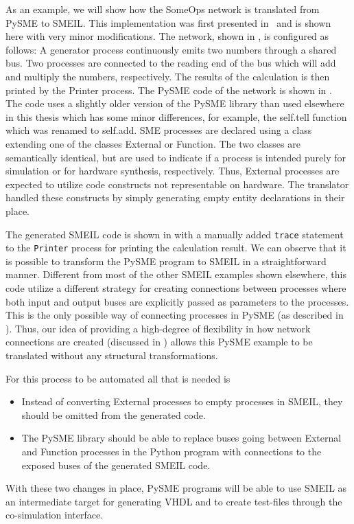 As an example, we will show how the SomeOps network is translated from PySME to
SMEIL.  This implementation was first presented in~\cite{asheim2016vhdl} and is
shown here with very minor modifications. The network, shown in
, is configured as follows: A generator process continuously
emits two numbers through a shared bus.  Two processes are connected to the
reading end of the bus which will add and multiply the numbers,
respectively. The results of the calculation is then printed by the Printer
process.  The PySME code of the network is shown in . The
code uses a slightly older version of the PySME library than used elsewhere in
this thesis which has some minor differences, for example, the {\ttfamily
  self.tell} function which was renamed to {\ttfamily self.add}.  SME processes
are declared using a class extending one of the classes {\ttfamily External} or
{\ttfamily Function}.  The two classes are semantically identical, but are used
to indicate if a process is intended purely for simulation or for hardware
synthesis, respectively.  Thus, {\ttfamily External} processes are expected to
utilize code constructs not representable on hardware.  The translator handled
these constructs by simply generating empty entity declarations in their place.

The generated SMEIL code is shown in  with a manually added
{\tt trace} statement to the {\tt Printer} process for printing the calculation
result. We can observe that it is possible to transform the PySME program to SMEIL
in a straightforward manner. Different from most of the other SMEIL examples
shown elsewhere, this code utilize a different strategy for creating connections
between processes where both input and output buses are explicitly passed as
parameters to the processes. This is the only possible way of connecting
processes in PySME (as described in ). Thus, our idea of
providing a high-degree of flexibility in how network connections are created
(discussed in ) allows this PySME example to be translated
without any structural transformations.

For this process to be automated all that is needed is
\begin{itemize}
  \item Instead of converting {\ttfamily External} processes to empty processes
    in SMEIL, they should be omitted from the generated code.
  \item The PySME library should be able to replace buses going between
    {\ttfamily External} and {\ttfamily Function} processes in the Python
    program with connections to the {\ttfamily exposed} buses of the generated
    SMEIL code.
\end{itemize}
With these two changes in place, PySME programs will be able to use SMEIL as an
intermediate target for generating VHDL and to create test-files through the
co-simulation interface.

